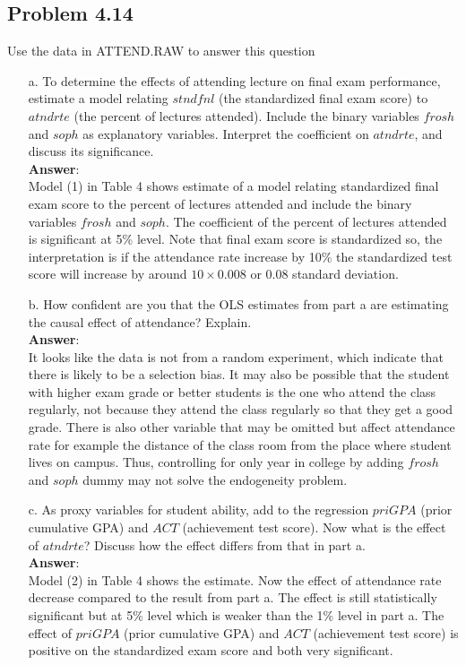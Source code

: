 \documentclass[10pt]{article}
\begin{document}
\subsection*{Problem 4.14}
Use the data in ATTEND.RAW to answer this question
\begin{enumerate}
\item[a.] To determine the effects of attending lecture on final exam performance, estimate a model relating $stndfnl$ (the standardized final exam score) to $atndrte$ (the percent of lectures attended). Include the binary variables $frosh$ and $soph$ as explanatory variables. Interpret the coefficient on $atndrte$, and discuss its significance.
\\ \textbf{Answer}:\\
Model (1) in Table 4 shows estimate of a model relating standardized final exam score to the percent of lectures attended and include the binary variables $frosh$ and $soph$. The coefficient of the percent of lectures attended is significant at 5\% level. Note that final exam score is standardized so, the interpretation is if the attendance rate increase by 10\% the standardized test score will increase by around $10\times0.008$ or 0.08 standard deviation.
\item[b.] How confident are you that the OLS estimates from part a are estimating the causal effect of attendance? Explain.
\\ \textbf{Answer}:\\
It looks like the data is not from a random experiment, which indicate that there is likely to be a selection bias. It may also be possible that the student with higher exam grade or better students is the one who attend the class regularly, not because they attend the class regularly so that they get a good grade. There is also other variable that may be omitted but affect attendance rate for example the distance of the class room from the place where student lives on campus. Thus, controlling for only year in college by adding $frosh$ and $soph$ dummy may not solve the endogeneity problem. 

\item[c.] As proxy variables for student ability, add to the regression $priGPA$ (prior cumulative GPA) and $ACT$ (achievement test score). Now what is the effect of $atndrte$? Discuss how the effect differs from that in part a.
\\ \textbf{Answer}:\\
Model (2) in Table 4 shows the estimate. Now the effect of attendance rate decrease compared to the result from part a. The effect is still statistically significant but at 5\% level which is weaker than the 1\% level in part a. The effect of $priGPA$ (prior cumulative GPA) and $ACT$ (achievement test score) is positive on the standardized exam score and both very significant.



\end{enumerate}
\end{document}
